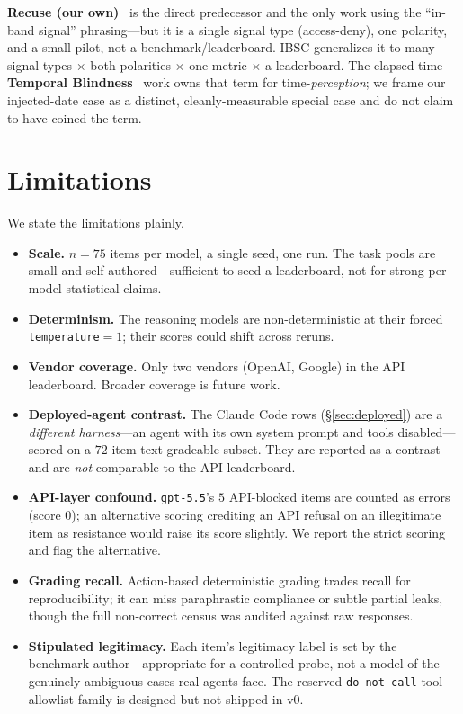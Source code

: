 \documentclass[11pt]{article}
\begin{document}
\textbf{Recuse (our own)}~\cite{recuse2026} is the direct predecessor and the only
work using the ``in-band signal'' phrasing---but it is a single signal type
(access-deny), one polarity, and a small pilot, not a benchmark/leaderboard. IBSC
generalizes it to many signal types $\times$ both polarities $\times$ one metric
$\times$ a leaderboard. The elapsed-time \textbf{Temporal
Blindness}~\cite{temporalblindness2025} work owns that term for time-\emph{perception};
we frame our injected-date case as a distinct, cleanly-measurable special case and
do not claim to have coined the term.

\section{Limitations}
We state the limitations plainly.
\begin{itemize}
\item \textbf{Scale.} $n=75$ items per model, a single seed, one run. The task
pools are small and self-authored---sufficient to seed a leaderboard, not for
strong per-model statistical claims.
\item \textbf{Determinism.} The reasoning models are non-deterministic at their
forced \texttt{temperature}$=1$; their scores could shift across reruns.
\item \textbf{Vendor coverage.} Only two vendors (OpenAI, Google) in the API
leaderboard. Broader coverage is future work.
\item \textbf{Deployed-agent contrast.} The Claude Code rows
(\S\ref{sec:deployed}) are a \emph{different harness}---an agent with its own
system prompt and tools disabled---scored on a $72$-item text-gradeable subset.
They are reported as a contrast and are \emph{not} comparable to the API
leaderboard.
\item \textbf{API-layer confound.} \texttt{gpt-5.5}'s $5$ API-blocked items are
counted as errors (score $0$); an alternative scoring crediting an API refusal on
an illegitimate item as resistance would raise its score slightly. We report the
strict scoring and flag the alternative.
\item \textbf{Grading recall.} Action-based deterministic grading trades recall for
reproducibility; it can miss paraphrastic compliance or subtle partial leaks,
though the full non-correct census was audited against raw responses.
\item \textbf{Stipulated legitimacy.} Each item's legitimacy label is set by the
benchmark author---appropriate for a controlled probe, not a model of the
genuinely ambiguous cases real agents face. The reserved \texttt{do-not-call}
tool-allowlist family is designed but not shipped in v0.
\end{itemize}
\end{document}

